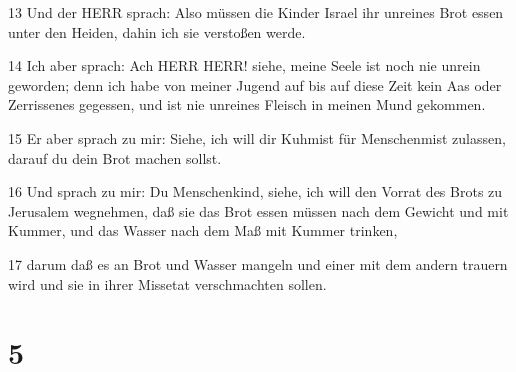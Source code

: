\par 13 Und der HERR sprach: Also müssen die Kinder Israel ihr unreines Brot essen unter den Heiden, dahin ich sie verstoßen werde.
\par 14 Ich aber sprach: Ach HERR HERR! siehe, meine Seele ist noch nie unrein geworden; denn ich habe von meiner Jugend auf bis auf diese Zeit kein Aas oder Zerrissenes gegessen, und ist nie unreines Fleisch in meinen Mund gekommen.
\par 15 Er aber sprach zu mir: Siehe, ich will dir Kuhmist für Menschenmist zulassen, darauf du dein Brot machen sollst.
\par 16 Und sprach zu mir: Du Menschenkind, siehe, ich will den Vorrat des Brots zu Jerusalem wegnehmen, daß sie das Brot essen müssen nach dem Gewicht und mit Kummer, und das Wasser nach dem Maß mit Kummer trinken,
\par 17 darum daß es an Brot und Wasser mangeln und einer mit dem andern trauern wird und sie in ihrer Missetat verschmachten sollen.

\chapter{5}

